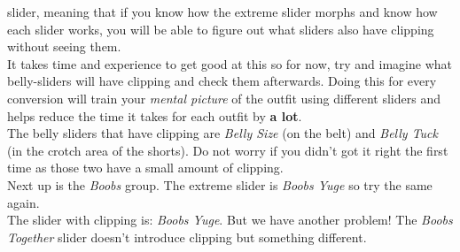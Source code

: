 slider, meaning that if you know how the extreme slider morphs and know how each slider works, you will be able to figure out 
what sliders also have clipping without seeing them.\\ It takes time and experience to get good at this so for now, try and 
imagine what belly-sliders will have clipping and check them afterwards. Doing this for every conversion will train your 
\textit{mental picture} of the outfit using different sliders and helps reduce the time it takes for each outfit by \textbf{a lot}.\\
The belly sliders that have clipping are \textit{Belly Size} (on the belt) and \textit{Belly Tuck} (in the crotch area of the shorts).
Do not worry if you didn't got it right the first time as those two have a small amount of clipping.\\
Next up is the \textit{Boobs} group. The extreme slider is \textit{Boobs Yuge} so try the same again.\\
The slider with clipping is: \textit{Boobs Yuge}. But we have another problem! The \textit{Boobs Together} slider doesn't 
introduce clipping but something different.

